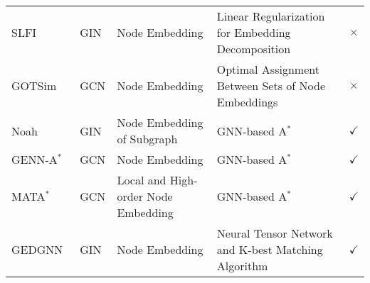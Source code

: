 \begin{table*}[h!]
\begin{small}
{\begin{tabular}{@{}llllc@{}}
SLFI~\cite{graphDB--gsc-gsc-SLFI}             & GIN             & Node Embedding                        & Linear Regularization for Embedding Decomposition & $\times$         \\
GOTSim~\cite{graphDB-gsc-gsc-graphotsim}           & GCN           & Node Embedding                        & Optimal Assignment Between Sets of Node Embeddings & $\times$       \\
Noah~\cite{graphdb-gsc-ged-noah}             & GIN             & Node Embedding of Subgraph            & GNN-based A$^*$                                                & $\checkmark$       \\
GENN-A$^*$~\cite{graphdb-gsc-ged-GENN-A*}          & GCN           & Node Embedding                        & GNN-based A$^*$                                               & $\checkmark$       \\
MATA$^*$~\cite{graphDB-gsc-ged-mata*}            & GCN           & Local and High-order Node Embedding   & GNN-based A$^*$                                               & $\checkmark$       \\
GEDGNN~\cite{graphdb-gsc-ged-gedgnn}           & GIN             & Node Embedding                        & Neural Tensor Network and K-best Matching Algorithm  & $\checkmark$       \\ \bottomrule
\end{tabular}
}
\end{small}
\end{table*}
